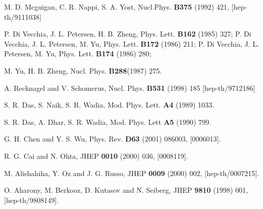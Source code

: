 \documentclass[a4paper,12pt]{article}
\begin{document}
\begin{thebibliography}{99}
M. D. Mcguigan, C. R. Nappi, S. A. Yost, 
Nucl.Phys. {\bf B375} (1992) 421, [hep-th/9111038]

 P. Di Vecchia, J. L. Petersen, H. B. Zheng, 
Phys. Lett. {\bf B162} (1985) 327; P. Di Vecchia, J. L. Petersen, 
M. Yu, Phys. Lett. {\bf B172} (1986) 211;
P. Di Vecchia, J. L. Petersen, M. Yu, Phys. Lett. {\bf B174} (1986)
280; 

 M. Yu, H. B. Zheng, Nucl. Phys. {\bf B288}(1987) 275. 

A. Recknagel and V. Schomerus, Nucl. Phys. 
{\bf B531} (1998) 185 [hep-th/9712186]

S. R. Das, S. Naik, S. R. Wadia, Mod. Phys. Lett. {\bf A4} 
(1989) 1033.


S. R. Das, A. Dhar, S. R. Wadia, Mod. Phys. Lett {\bf A5} 
(1990) 799.

G. H. Chen and Y. S. Wu, Phys. Rev. {\bf D63} (2001) 
086003, [0006013].

R. G. Cai and N. Ohta, JHEP {\bf 0010} (2000) 036,
[0008119].

M. Alishahiha, Y. Oz and J. G. Russo, JHEP 
{\bf 0009} (2000) 002, [hep-th/0007215].

O. Aharony, M. Berkooz, D. Kutasov and N. Seiberg, 
JHEP {\bf 9810} (1998) 001, [hep-th/9808149].

\end{thebibliography}
\end{document}
